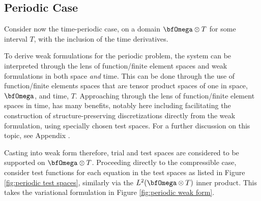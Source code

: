 \subsection*{Periodic Case}


    Consider now the time-periodic case, on a domain $\bfOmega\otimes T$ for some interval $T$, with the inclusion of the time derivatives.
    
     To derive weak formulations for the periodic problem, the system can be interpreted through the lens of function/finite element spaces and weak formulations in both space \emph{and} time. This can be done through the use of function/finite elements spaces that are tensor product spaces of one in space, $\bfOmega$, and time, $T$. Approaching through the lens of function/finite element spaces in time, has many benefits, notably here including facilitating the construction of structure-preserving discretizations directly from the weak formulation, using specially chosen test spaces. For a further discussion on this topic, see Appendix . 

    Casting into weak form therefore, trial and test spaces are considered to be supported on $\bfOmega\otimes T$. Proceeding directly to the compressible case, consider test functions for each equation in the test spaces as listed in Figure \ref{fig:periodic test spaces}, similarly via the $L^{2}(\bfOmega\otimes T)$ inner product. This takes the variational formulation in Figure \ref{fig:periodic weak form}.
    
